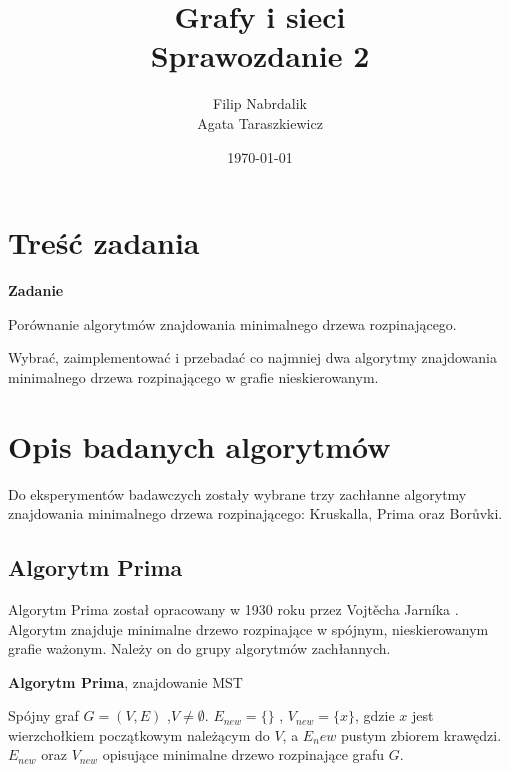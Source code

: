 \documentclass[a4paper, 10pt]{article}
\title{{\bf {Grafy i sieci}} \\ {\large Sprawozdanie 2}}
\date{\today}
\author{Filip Nabrdalik \\Agata Taraszkiewicz}
\begin{document}




\maketitle 




\newcommand{\ang}[1]{(ang. {\em #1}\/)}
\newcommand{\e}[1]{{\em #1}\/}





\section{Treść zadania}

{\bf{Zadanie}}

Porównanie algorytmów znajdowania minimalnego drzewa rozpinającego.

Wybrać, zaimplementować i przebadać co najmniej dwa algorytmy znajdowania minimalnego drzewa rozpinającego w grafie nieskierowanym. 

 

\section{Opis badanych algorytmów}

Do eksperymentów badawczych zostały wybrane trzy zachłanne algorytmy znajdowania minimalnego drzewa rozpinającego: Kruskalla, Prima oraz
Borůvki.

	\subsection{Algorytm Prima}
Algorytm Prima został opracowany w 1930 roku przez Vojtěcha Jarníka \cite{algo:prim}. Algorytm znajduje minimalne drzewo rozpinające w spójnym, nieskierowanym grafie ważonym. Należy on do grupy algorytmów zachłannych.
\begin{algorithm}
\caption{{\bf Algorytm Prima}, znajdowanie MST}
\begin{algorithmic}[!h]
\REQUIRE Spójny graf $G=(V,E)$ ,$V \neq \emptyset$. 
\ENSURE $E_{new}=\{\}$ , $V_{new}=\{x\}$, gdzie $x$ jest wierzchołkiem początkowym należącym do $V$, a $E_new$ pustym zbiorem krawędzi.
\STATE {}
\STATE {}   
\ENDWHILE
\RETURN $E_{new}$ oraz $V_{new}$ opisujące minimalne drzewo rozpinające grafu $G$. 
\end{algorithmic}
\end{algorithm}	
\FloatBarrier
\end{document}
